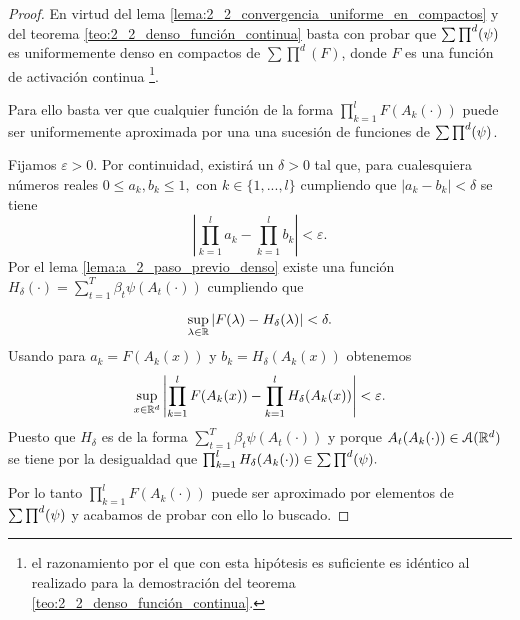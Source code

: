 \begin{proof}
    En virtud del lema \ref{lema:2_2_convergencia_uniforme_en_compactos} y del 
    teorema \ref{teo:2_2_denso_función_continua} basta con probar que 
    $\sum \prod^d (\psi)$ es uniformemente denso en compactos de $\sum \prod^d(F)$, 
    donde $F$ es una función de activación continua 
    \footnote{el razonamiento 
    por el que con esta hipótesis es suficiente es idéntico al realizado para la 
    demostración del teorema \ref{teo:2_2_denso_función_continua}.}.

    Para ello basta ver que cualquier función de la forma $\prod_{k=1}^l F(A_k(\cdot))$
    puede ser uniformemente aproximada por una una sucesión de funciones de $\sum \prod^d (\psi)$.

    Fijamos $\varepsilon > 0$. 
    Por continuidad, existirá un $\delta >0$
    tal que, para cualesquiera números reales $0 \leq a_k, b_k \leq 1,$ con $k \in \{1,...,l\}$ 
    cumpliendo que $|a_k -b_k| < \delta$ se tiene
    \begin{equation} \label{eq:teorema_2_3__1}
        \left| 
            \prod^l_{k=1} a_k - \prod^l_{k=1} b_k 
        \right| 
        < 
        \varepsilon.
    \end{equation}
    Por el lema \ref{lema:a_2_paso_previo_denso} existe una función 
    $H_{\delta}(\cdot) = \sum_{t=1}^T \beta_t \psi(A_t(\cdot))$
    cumpliendo que 

    \begin{equation}
        \sup_{\lambda \in \mathbb{R}} |F(\lambda) - H_{\delta}(\lambda) | < \delta.
    \end{equation}
    Usando  para 
    $a_k = F(A_k(x))$ y $b_k = H_\delta(A_k(x))$
    obtenemos
    \begin{equation}\label{eq:teorema2_3__3}
        \sup_{x \in \mathbb{R}^d} 
        \left| 
            \prod ^l_{k=1} F(A_k(x))
            -
            \prod ^l_{k=1} H_\delta(A_k(x))
        \right| 
        < 
        \varepsilon.
    \end{equation} 
    Puesto que $H_\delta$ es de la forma  $\sum_{t=1}^T \beta_t \psi(A_t(\cdot))$ 
    y porque $A_t(A_k(\cdot)) \in \mathcal{A}(\mathbb{R}^d)$ se tiene por la desigualdad  que 
    $\prod ^l_{k=1} H_\delta(A_k(\cdot)) \in \sum \prod^d (\psi).$

    Por lo tanto $\prod ^l_{k=1} F(A_k(\cdot))$ puede ser 
    aproximado por elementos de $\sum \prod^d (\psi)$ y acabamos de probar con ello lo buscado. 
\end{proof} 

